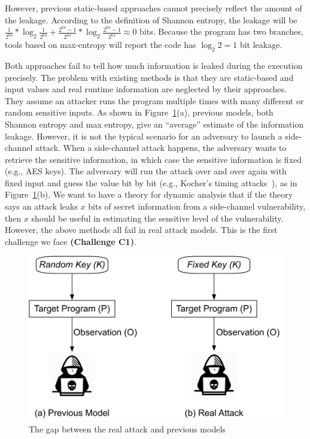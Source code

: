 However, previous static-based approaches cannot precisely reflect the amount of
the leakage. According to the definition of Shannon entropy, the leakage will be
$\frac{1}{2^{64}}*\log_{2}\frac{1}{2^{64}} + \frac{2^{64}-1}{2^{64}}
*\log_{2}\frac{2^{64}-1}{2^{64}} \approx 0$ bits. Because the program has two
branches, tools based on max-entropy will report the code has $\log_2{2} = 1$
bit leakage.

Both approaches fail to tell how much information is leaked during the execution
precisely. The problem with existing methods is that they are static-based and
input values and real runtime information are neglected by their approaches. 
They assume an attacker runs
the program multiple times with many different or random sensitive inputs. As
shown in Figure~\ref{fig:gap}(a), previous models, both Shannon entropy and max
entropy, give an ``average'' estimate of the information leakage. However, it is
not the typical scenario for an adversary to launch a side-channel attack. When
a side-channel attack happens, the adversary wants to retrieve the sensitive
information, in which case the sensitive information is fixed (e.g., AES keys).
The adversary will run the attack over and over again with fixed input and 
guess the value bit by
bit (e.g., Kocher's timing attacks~\cite{kocher1996timing}), as in Figure~\ref{fig:gap}(b). We want to have a
theory for dynamic analysis that if the theory says an attack leaks $x$ bits of
secret information from a side-channel vulnerability, then $x$ should be useful
in estimating the sensitive level of the vulnerability. However, the above
methods all fail in real attack models. This is the first challenge we face
\textbf{(Challenge C1)}.

\begin{figure}
    \centering
    \includegraphics[width=.65\columnwidth]{./figures/RA.pdf}
\vspace*{-6pt}
    \caption{The gap between the real attack and previous models}\label{fig:gap}
\end{figure}


